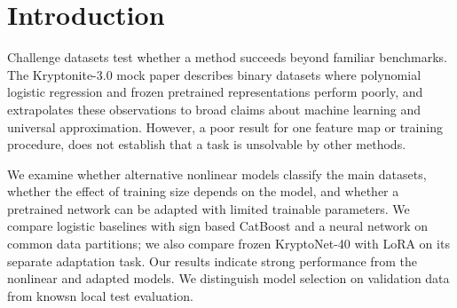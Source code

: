 \documentclass{article}
\begin{document}
\printAffiliationsAndNotice{}
\begin{abstract}
The Kryptonite-3.0 challenge argues that polynomial classifiers, additional data, and a pretrained network cannot solve its binary classification tasks. We examine these claims using logistic regression, boosted trees, neural networks, and low rank adaptation (LoRA). On shared validation sets, a sign based boosted tree model reaches 94.58--95.42\% accuracy on the three main datasets, while quadratic logistic regression reaches 52.75--53.86\%. On the adaptation validation set, rank-1 LoRA reaches 96.33\% mean accuracy across three training seeds, compared with 49.00\% zero-shot. These development results challenge the paper's broad empirical claims, but hidden set accuracy remains unknown and final model evaluation on hidden set is remain to be validated.
\end{abstract}

\section{Introduction}
Challenge datasets test whether a method succeeds beyond familiar benchmarks. The Kryptonite-3.0 mock paper \cite{quinn2026} describes binary datasets where polynomial logistic regression and frozen pretrained representations perform poorly, and extrapolates these observations to broad claims about machine learning and universal approximation. However, a poor result for one feature map or training procedure, does not establish that a task is unsolvable by other methods.

We examine whether alternative nonlinear models classify the main datasets, whether the effect of training size depends on the model, and whether a pretrained network can be adapted with limited trainable parameters. We compare logistic baselines with sign based CatBoost and a neural network on common data partitions; we also compare frozen KryptoNet-40 with LoRA on its separate adaptation task. Our results indicate strong performance from the nonlinear and adapted models. We distinguish model selection on validation data from knowsn local test evaluation.
\end{document}
